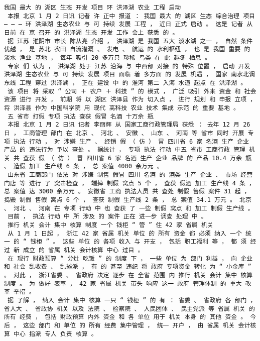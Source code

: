 \documentclass{article}
\begin{document}
\begin{Verbatim}[commandchars=\\\{\}]
 我国 最大 的 湖区 生态 开发 项目 环 洪泽湖 农业 工程 启动 
 本报 北京 1 月 2 日讯 记者 许 正中 报道 ： 我国 最大 的 湖区 生态 综合治理 项目 — — — 环 洪泽湖 生态农业 与 可 持续 发展 工程 ， 近日 正式 启动 。 这是 记者 从 日前 在 京 召开 的 洪泽湖 生态 开发 工作 会上 获悉 的 。 
 据 江苏 淮阴市 市长 陈从亮 介绍 ， 洪泽湖 是 我国 五大 淡水湖 之一 ， 自然 条件 优越 ， 是 苏北 农田 自流灌溉 、 发电 、 航运 的 水利枢纽 ， 也 是 我国 重要 的 淡水 渔业 基地 ， 每年 吸引 20 多万只 珍稀 鸟类 在 此 越冬 栖息 。 
 专家 们 认为 ， 洪泽湖 处于 江苏 沿海 与 中西部 对接 的 特殊 位置 ， 启动 开发 洪泽湖 生态农业 与 可 持续 发展 项目 面临 着 多方面 的 发展 机遇 ， 国家 南水北调 东线 工程 穿过 洪泽湖 ， 正在 建设 中 的 淮河 第二 入海 水道 起点 在 洪泽湖 。 
 该 项目 将 采取 “ 公司 ＋ 农户 ＋ 科技 ” 的 模式 ， 广泛 吸引 外来 资金 和 社会 资源 进行 开发 ， 前期 将 以 湖区 洪泽县 作为 切入点 ， 进行 规划 和 申报 立项 ， 将 洪泽县 作为 中国科学院 用 现代 高科技 农业 技术 集成 示范 的 重要 基地 。 
 五 省市 打假 专项 执法 查获 假冒 名酒 十万余 瓶 
 本报 北京 1 月 2 日讯 记者 李丽辉 从 国家工商行政管理局 获悉 ： 去年 12 月 26 日 ， 工商管理 部门 在 北京 、 河北 、 安徽 、 山东 、 河南 等 省市 同时 开展 专项 执法 行动 ， 对 涉嫌 生产 、 经销 假 （ 仿 ） 冒 四川省 6 家 名酒 生产 企业 产品 的 违法行为 予以 查处 。 据统计 ， 专项 执法 行动 中五 省市 工商行政 管理 机关 共 查获 假 （ 仿 ） 冒 四川省 6 家 名酒 生产 企业 品牌 的 产品 10.4 万余 瓶 、 造假 加工 生产线 6 条 ， 总 案值 4000 余万元 。 
 山东省 工商部门 依法 对 涉嫌 制售 假冒 四川 名酒 的 酒类 生产 企业 、 市场 经营 门店 等 进行 了 突击检查 ， 端掉 制假 窝点 5 个 ， 查获 假酒 加工 生产线 4 条 ， 总 案值 达 3000 余万元 。 安徽省 工商 执法人员 共 查处 制假 售假 案件 31 起 ， 捣毁 制假 售假 窝点 6 个 ， 查获 制假 生产线 2 条 ， 总 案值 34.1 万元 。 北京 、 河北 、 河南 在 专项 行动 中 也 查获 了 一些 制假 窝点 和 加工 制假 生产线 。 
 目前 ， 执法 行动 中 所 涉及 的 案件 正在 进一步 调查 处理 中 。 
 推行 机关 会计 集中 核算 制度 一个 钱柜 “ 管 ” 住 42 家 省属 机关 
 从 1 月 1 日起 ， 浙江 42 家 省属 机关 单位 的 所有 资金 都 必须 纳入 一个 统一 的 “ 钱柜 ” 。 这些 单位 的 各项 收入 与 开支 ， 包括 职工福利 等 ， 都 须 经过 新 成立 的 省属 机关 会计核算 中心 过目 。 
 在 现行 财政预算 “ 分灶 吃饭 ” 的 制度 下 ， 一些 单位 为 部门 利益 ， 向 企业 和 社会 乱收费 、 乱摊派 ， 有 的 甚至 违纪 将 政府 专项资金 转化 为 “ 小金库 ” 。 对此 ， 浙江省委 、 省政府 决定 逐步 在 全省 范围 内 推行 机关 会计 集中 核算 制度 。 为 做好 表率 ， 42 家 省属 机关 带头 响应 这一 政府 管理体制 的 重大 改革 举措 。 
 据 了解 ， 纳入 会计 集中 核算 一只 “ 钱柜 ” 的 有 ： 省委 、 省政府 各 部门 ， 省人大 、 省政协 机关 以及 法院 、 检察院 、 人民团体 、 民主党派 等 省属 机关 的 所有 经费 ， 包括 财政预算 内外 资金 和 各 单位 用于 机关 本身 的 其他 资金 。 今后 ， 这些 部门 和 单位 的 所有 经费 集中管理 ， 统一 开户 ， 由 省属 机关 会计核算 中心 指派 专人 负责 核算 。 

\end{Verbatim}
\end{document}
